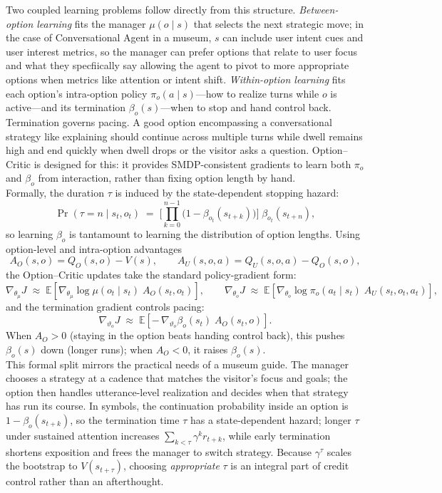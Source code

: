 \documentclass[12pt]{article}
\begin{document}
Two coupled learning problems follow directly from this structure. \emph{Between-option learning} fits the manager $\mu(o\mid s)$ that selects the next strategic move; in the case of Conversational Agent in a museum, $s$ can include user intent cues and user interest metrics, so the manager can prefer options that relate to user focus and what they specfiically say allowing the agent to pivot to more appropriate options when metrics like attention or intent shift. \emph{Within-option learning} fits each option’s intra-option policy $\pi_o(a\mid s)$—how to realize turns while $o$ is active—and its termination $\beta_o(s)$—when to stop and hand control back. Termination governs pacing. A good option encompassing a conversational strategy like explaining should continue across multiple turns while dwell remains high and end quickly when dwell drops or the visitor asks a question. Option--Critic \citep{bacon2017option} is designed for this: it provides SMDP-consistent gradients to learn both $\pi_o$ and $\beta_o$ from interaction, rather than fixing option length by hand.\\

Formally, the duration $\tau$ is induced by the state-dependent stopping hazard:
\[
\Pr(\tau=n\mid s_t,o_t)\;=\;\Biggl[\prod_{k=0}^{n-1}\bigl(1-\beta_{o_t}(s_{t+k})\bigr)\Biggr]\;\beta_{o_t}(s_{t+n}),
\]
so learning $\beta_o$ is tantamount to learning the distribution of option lengths. Using option-level and intra-option advantages
\[
A_O(s,o)=Q_O(s,o)-V(s),\qquad A_U(s,o,a)=Q_U(s,o,a)-Q_O(s,o),
\]
the Option--Critic updates take the standard policy-gradient form:
\[
\nabla_{\theta_\mu} J \;\approx\; \mathbb{E}\!\left[\nabla_{\theta_\mu}\log \mu(o_t\!\mid s_t)\;A_O(s_t,o_t)\right],\qquad
\nabla_{\theta_o} J \;\approx\; \mathbb{E}\!\left[\nabla_{\theta_o}\log \pi_o(a_t\!\mid s_t)\;A_U(s_t,o_t,a_t)\right],
\]
and the termination gradient controls pacing:
\[
\nabla_{\vartheta_o} J \;\approx\; \mathbb{E}\!\left[-\,\nabla_{\vartheta_o}\beta_o(s_t)\;A_O(s_t,o)\right].
\]
When $A_O>0$ (staying in the option beats handing control back), this pushes $\beta_o(s)$ down (longer runs); when $A_O<0$, it raises $\beta_o(s)$.\\

This formal split mirrors the practical needs of a museum guide. The manager chooses a strategy at a cadence that matches the visitor’s focus and goals; the option then handles utterance-level realization and decides when that strategy has run its course. In symbols, the continuation probability inside an option is $1-\beta_o(s_{t+k})$, so the termination time $\tau$ has a state-dependent hazard; longer $\tau$ under sustained attention increases $\sum_{k<\tau}\gamma^k r_{t+k}$, while early termination shortens exposition and frees the manager to switch strategy. Because $\gamma^\tau$ scales the bootstrap to $V(s_{t+\tau})$, choosing \emph{appropriate} $\tau$ is an integral part of credit control rather than an afterthought.\\
\end{document}

